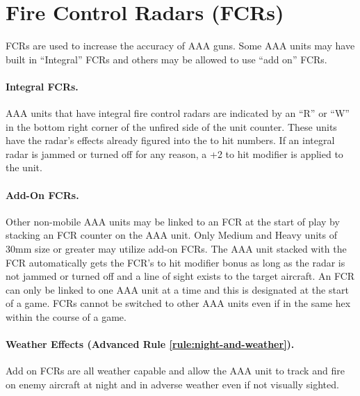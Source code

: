 
\section{Fire Control Radars (FCRs)}

FCRs are used to increase the accuracy of AAA guns. Some AAA units may have built in “Integral” FCRs and others may be allowed to use “add on” FCRs.

\paragraph{Integral FCRs.} AAA units that have integral fire control radars are indicated by an “R” or “W” in the bottom right corner of the unfired side of the unit counter. These units have the radar's effects already figured into the to hit numbers. If an integral radar is jammed or turned off for any reason, a +2 to hit modifier is applied to the unit.

\paragraph{Add-On FCRs.} Other non-mobile AAA units may be linked to an FCR at the start of play by stacking an FCR counter on the AAA unit. Only Medium and Heavy units of 30mm size or greater may utilize add-on FCRs. The AAA unit stacked with the FCR automatically gets the FCR's to hit modifier bonus as long as the radar is not jammed or turned off and a line of sight exists to the target aircraft. An FCR can only be linked to one AAA unit at a time and this is designated at the start of a game. FCRs cannot be switched to other AAA units even if in the same hex within the course of a game.

\paragraph{Weather Effects (Advanced Rule \ref{rule:night-and-weather}).} Add on FCRs are all weather capable and allow the AAA unit to track and fire on enemy aircraft at night and in adverse weather even if not visually sighted.

